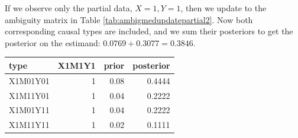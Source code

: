 \documentclass[
  12pt,
]{book}
\begin{document}
If we observe only the partial data, \(X=1, Y=1\), then we update to the ambiguity matrix in Table \ref{tab:ambigmedupdatepartial2}. Now both corresponding causal types are included, and we sum their posteriors to get the posterior on the estimand: \(0.0769 + 0.3077 = 0.3846\).

\begin{tabular}{l|r|r|r}
\hline
type & X1M1Y1 & prior & posterior\\
\hline
X1M01Y01 & 1 & 0.08 & 0.4444\\
\hline
X1M11Y01 & 1 & 0.04 & 0.2222\\
\hline
X1M01Y11 & 1 & 0.04 & 0.2222\\
\hline
X1M11Y11 & 1 & 0.02 & 0.1111\\
\hline
\end{tabular}
\end{document}
